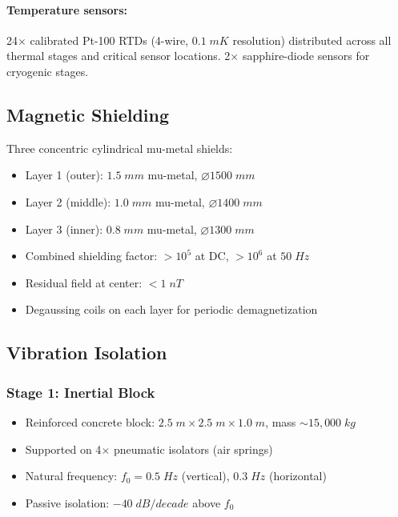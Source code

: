 \documentclass[11pt,a4paper]{article}
\begin{document}
\paragraph{Temperature sensors:} 24$\times$ calibrated Pt-100 RTDs
(4-wire, $0.1\;\si{mK}$ resolution) distributed across all thermal
stages and critical sensor locations.  2$\times$ sapphire-diode
sensors for cryogenic stages.

\subsection{Magnetic Shielding}

Three concentric cylindrical mu-metal shields:
\begin{itemize}[nosep]
\item Layer 1 (outer): $1.5\;\si{mm}$ mu-metal, $\varnothing 1500\;\si{mm}$
\item Layer 2 (middle): $1.0\;\si{mm}$ mu-metal, $\varnothing 1400\;\si{mm}$
\item Layer 3 (inner): $0.8\;\si{mm}$ mu-metal, $\varnothing 1300\;\si{mm}$
\item Combined shielding factor: $> 10^5$ at DC, $> 10^6$ at $50\;\si{Hz}$
\item Residual field at center: $< 1\;\si{nT}$
\item Degaussing coils on each layer for periodic demagnetization
\end{itemize}

\subsection{Vibration Isolation}

\subsubsection{Stage 1: Inertial Block}

\begin{itemize}[nosep]
\item Reinforced concrete block: $2.5\;\si{m} \times 2.5\;\si{m}
\times 1.0\;\si{m}$, mass $\sim 15{,}000\;\si{kg}$
\item Supported on 4$\times$ pneumatic isolators (air springs)
\item Natural frequency: $f_0 = 0.5\;\si{Hz}$ (vertical),
$0.3\;\si{Hz}$ (horizontal)
\item Passive isolation: $-40\;\si{dB/decade}$ above $f_0$
\end{itemize}
\end{document}
